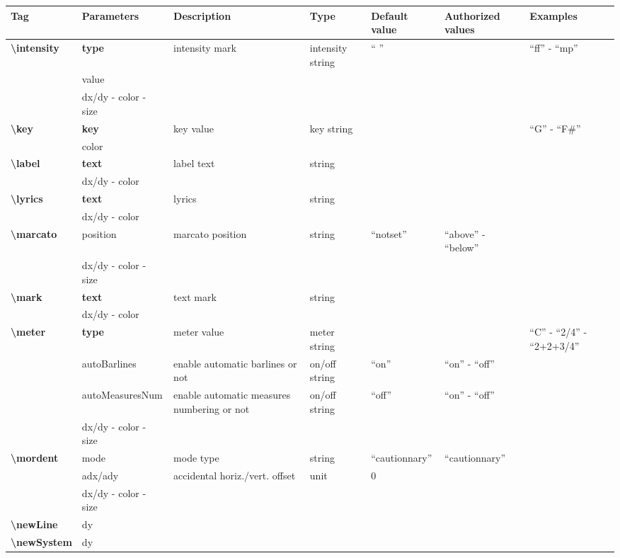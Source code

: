 \documentclass[a4paper, landscape, 10pt]{article}
\begin{document}
\begin{tabularx}{\linewidth}{p{3cm}p{3cm}p{5cm}p{3cm}p{2.5cm}p{3.5cm}p{4cm}}
    \hline
    \textbf{Tag}&\textbf{Parameters}&\textbf{Description}&\textbf{Type}&\textbf{Default value}&\textbf{Authorized values}&\textbf{Examples}\\
    \hline
    \textbf{\textbackslash{}intensity}&\textbf{type}&intensity mark&intensity string&`` ''&&``ff'' - ``mp''\\
    &value&&&&&\\ %
    &dx/dy - color - size&&&&&\\
    \hline
    \textbf{\textbackslash{}key}&\textbf{key}&key value&key string&&&``G'' - ``F\#''\\
    &color&&&&&\\
    \hline
    \textbf{\textbackslash{}label}&\textbf{text}&label text&string&&&\\
    &dx/dy - color&&&&&\\
    \hline
    \textbf{\textbackslash{}lyrics}&\textbf{text}&lyrics&string&&&\\
    &dx/dy - color&&&&&\\
    \hline
    \textbf{\textbackslash{}marcato}&position&marcato position&string&``notset''&``above'' - ``below''&\\
    &dx/dy - color - size&&&&&\\
    \hline
    \textbf{\textbackslash{}mark}&\textbf{text}&text mark&string&&&\\
    &dx/dy - color&&&&&\\
    \hline
    \textbf{\textbackslash{}meter}&\textbf{type}&meter value&meter string&&&``C'' - ``2/4'' - ``2+2+3/4''\\
    &autoBarlines&enable automatic barlines or not&on/off string&``on''&``on'' - ``off''&\\
    &autoMeasuresNum&enable automatic measures numbering or not&on/off string&``off''&``on'' - ``off''&\\
    &dx/dy - color - size&&&&&\\
    \hline
    \textbf{\textbackslash{}mordent}&mode&mode type&string&``cautionnary''&``cautionnary''&\\
    &adx/ady&accidental horiz./vert. offset&unit&0&&\\
    &dx/dy - color - size&&&&&\\
    \hline
    \textbf{\textbackslash{}newLine}&dy&&&&&\\ %
    \hline
    \textbf{\textbackslash{}newSystem}&dy&&&&&\\ %

\end{tabularx}
\end{document}
